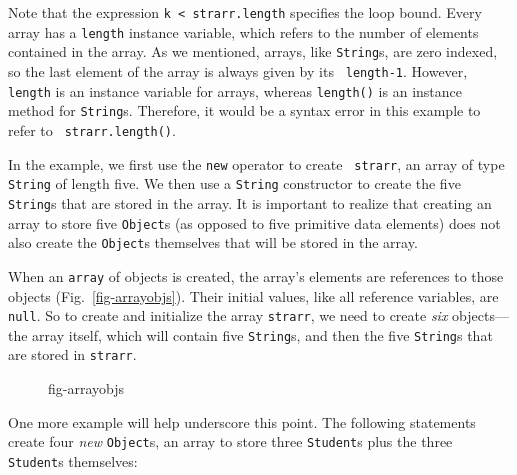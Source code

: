 \noindent Note that the expression \verb|k < strarr.length| specifies
the loop bound.  Every array has a {\tt length}
instance variable, which refers to the number of elements contained in
the array.  As we mentioned, arrays, like {\tt String}s, are zero
indexed, so the last element of the array is always given by its {\tt
length-1}.  However, {\tt length} is an instance variable for arrays,
whereas {\tt length()} is an instance method for {\tt String}s.
Therefore, it would be a syntax error in this example to refer to {\tt
strarr.length()}.


In the example, we first use the {\tt new} operator to create {\tt
strarr}, an array of type {\tt String} of length five.  We then use a
{\tt String} constructor to create the five {\tt String}s that are
stored in the array.  It is important to realize that creating an
array to store five {\tt Object}s (as opposed to five primitive data
elements) does not also create the {\tt Object}s themselves that will
be stored in the array.

When an {\tt array} of objects is created, the array's elements are
references to those objects (Fig.~\ref{fig-arrayobjs}). Their initial
values, like all reference variables, are {\tt null}.  So to create
and initialize the array {\tt strarr}, we need to create {\it six}
objects---the array itself, which will contain five {\tt String}s, and
then the five {\tt String}s that are stored in {\tt strarr}.

\begin{figure}[tb]
{fig-arrayobjs}
\end{figure}

One more example will help underscore this point.   The following
statements create four {\it new} {\tt Object}s, an array to store
three {\tt Student}s plus the three {\tt Student}s themselves:

